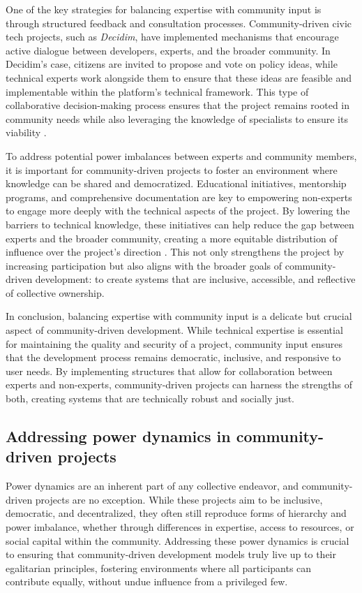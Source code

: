 \begin{refsection}
One of the key strategies for balancing expertise with community input is through structured feedback and consultation processes. Community-driven civic tech projects, such as \textit{Decidim}, have implemented mechanisms that encourage active dialogue between developers, experts, and the broader community. In Decidim’s case, citizens are invited to propose and vote on policy ideas, while technical experts work alongside them to ensure that these ideas are feasible and implementable within the platform’s technical framework. This type of collaborative decision-making process ensures that the project remains rooted in community needs while also leveraging the knowledge of specialists to ensure its viability \cite[pp.~110-113]{schweik2018}.

To address potential power imbalances between experts and community members, it is important for community-driven projects to foster an environment where knowledge can be shared and democratized. Educational initiatives, mentorship programs, and comprehensive documentation are key to empowering non-experts to engage more deeply with the technical aspects of the project. By lowering the barriers to technical knowledge, these initiatives can help reduce the gap between experts and the broader community, creating a more equitable distribution of influence over the project’s direction \cite[pp.~98-101]{mcalevey2021}. This not only strengthens the project by increasing participation but also aligns with the broader goals of community-driven development: to create systems that are inclusive, accessible, and reflective of collective ownership.

In conclusion, balancing expertise with community input is a delicate but crucial aspect of community-driven development. While technical expertise is essential for maintaining the quality and security of a project, community input ensures that the development process remains democratic, inclusive, and responsive to user needs. By implementing structures that allow for collaboration between experts and non-experts, community-driven projects can harness the strengths of both, creating systems that are technically robust and socially just.

\subsection{Addressing power dynamics in community-driven projects}

Power dynamics are an inherent part of any collective endeavor, and community-driven projects are no exception. While these projects aim to be inclusive, democratic, and decentralized, they often still reproduce forms of hierarchy and power imbalance, whether through differences in expertise, access to resources, or social capital within the community. Addressing these power dynamics is crucial to ensuring that community-driven development models truly live up to their egalitarian principles, fostering environments where all participants can contribute equally, without undue influence from a privileged few.


\end{refsection}
